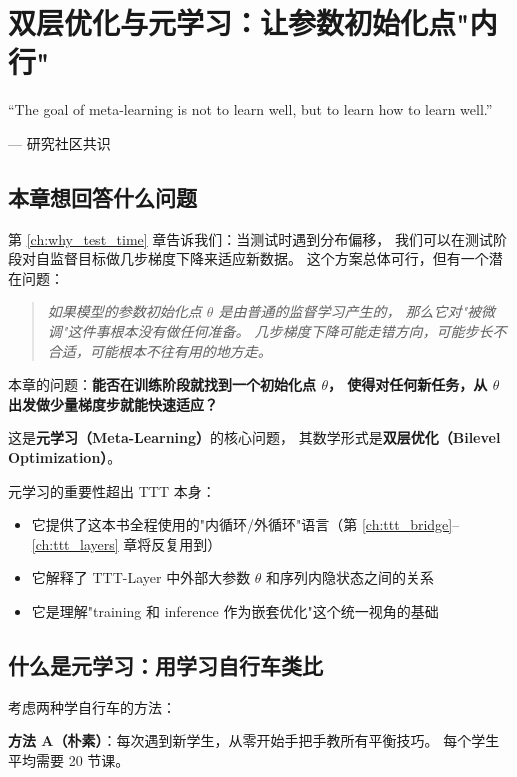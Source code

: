 \chapter{双层优化与元学习：让参数初始化点"内行"}
\label{ch:bilevel}

\epigraph{``The goal of meta-learning is not to learn well, but to learn how to learn well.''}{--- 研究社区共识}

\section{本章想回答什么问题}

第 \ref{ch:why_test_time} 章告诉我们：当测试时遇到分布偏移，
我们可以在测试阶段对自监督目标做几步梯度下降来适应新数据。
这个方案总体可行，但有一个潜在问题：

\begin{quote}
\textit{如果模型的参数初始化点 $\theta$ 是由普通的监督学习产生的，
那么它对"被微调"这件事根本没有做任何准备。
几步梯度下降可能走错方向，可能步长不合适，可能根本不往有用的地方走。}
\end{quote}

本章的问题：\textbf{能否在训练阶段就找到一个初始化点 $\theta$，
使得对任何新任务，从 $\theta$ 出发做少量梯度步就能快速适应？}

这是\textbf{元学习（Meta-Learning）}的核心问题，
其数学形式是\textbf{双层优化（Bilevel Optimization）}。

元学习的重要性超出 TTT 本身：
\begin{itemize}
  \item 它提供了这本书全程使用的"内循环/外循环"语言（第 \ref{ch:ttt_bridge}--\ref{ch:ttt_layers} 章将反复用到）
  \item 它解释了 TTT-Layer 中外部大参数 $\theta$ 和序列内隐状态之间的关系
  \item 它是理解"training 和 inference 作为嵌套优化"这个统一视角的基础
\end{itemize}

\section{什么是元学习：用学习自行车类比}
\label{sec:bilevel_intuition}

考虑两种学自行车的方法：

\textbf{方法 A（朴素）}：每次遇到新学生，从零开始手把手教所有平衡技巧。
每个学生平均需要 20 节课。

